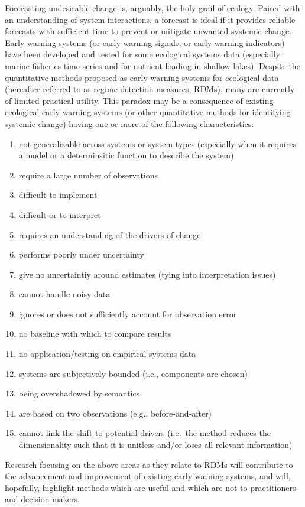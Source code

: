 \documentclass[12pt,twoside,openany]{reedthesis}
\providecommand{\tightlist}{%
  \setlength{\itemsep}{0pt}\setlength{\parskip}{0pt}}
\begin{document}
Forecasting undesirable change is, arguably, the holy grail of ecology. Paired with an understanding of system interactions, a forecast is ideal if it provides reliable forecasts with sufficient time to prevent or mitigate unwanted systemic change. Early warning systems (or early warning signals, or early warning indicators) have been developed and tested for some ecological systems data (especially marine fisheries time series and for nutrient loading in shallow lakes). Despite the quantitative methods proposed as early warning systems for ecological data (hereafter referred to as regime detection measures, RDMs), many are currently of limited practical utility. This paradox may be a consequence of existing ecological early warning systems (or other quantitative methods for identifying systemic change) having one or more of the following characteristics:
\begin{enumerate}
\def\labelenumi{\arabic{enumi}.}
\tightlist
\item
  not generalizable across systems or system types (especially when it requires a model or a determinsitic function to describe the system)
\item
  require a large number of observations
\item
  difficult to implement
\item
  difficult or to interpret
\item
  requires an understanding of the drivers of change
\item
  performs poorly under uncertainty
\item
  give no uncertaintiy around estimates (tying into interpretation issues)
\item
  cannot handle noisy data
\item
  ignores or does not sufficiently account for observation error
\item
  no baseline with which to compare results
\item
  no application/testing on empirical systems data
\item
  systems are subjectively bounded (i.e., components are chosen)
\item
  being overshadowed by semantics
\item
  are based on two observations (e.g., before-and-after)
\item
  cannot link the shift to potential drivers (i.e.~the method reduces the dimensionality such that it is unitless and/or loses all relevant information)
\end{enumerate}
Research focusing on the above areas as they relate to RDMs will contribute to the advancement and improvement of existing early warning systems, and will, hopefully, highlight methods which are useful and which are not to practitioners and decision makers.
\end{document}
